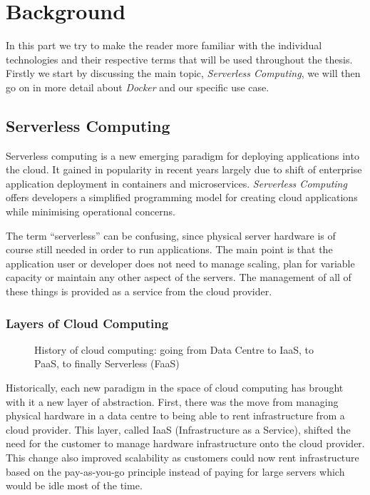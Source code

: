 \chapter{Background}
\label{sec:background}

In this part we try to make the reader more familiar with the individual technologies and their
respective terms that will be used throughout the thesis. Firstly we start by discussing the main
topic, \textit{Serverless Computing}, we will then go on in more detail about \textit{Docker} and
our specific use case.

\section{Serverless Computing}

Serverless computing is a new emerging paradigm for deploying applications into the cloud. It gained
in popularity in recent years largely due to shift of enterprise application deployment in
containers and microservices. \textit{Serverless Computing} offers developers a simplified
programming model for creating cloud applications while minimising operational concerns.
\cite{servprog}

The term “serverless” can be confusing, since physical server hardware is of course still needed in
order to run applications. The main point is that the application user or developer does not need to
manage scaling, plan for variable capacity or maintain any other aspect of the servers. The
management of all of these things is provided as a service from the cloud provider.
\cite{wikiservcomp}

\subsection{Layers of Cloud Computing}

\begin{figure}[H]
  \centering
  \caption{History of cloud computing: going from Data Centre to IaaS, to PaaS, to finally
  Serverless (FaaS) \cite{layercloudcomp}}
\end{figure}

Historically, each new paradigm in the space of cloud computing has brought with it a new layer of
abstraction. First, there was the move from managing physical hardware in a data centre to being
able to rent infrastructure from a cloud provider. This layer, called IaaS (Infrastructure as a
Service), shifted the need for the customer to manage hardware infrastructure onto the cloud
provider. This change also improved scalability as customers could now rent infrastructure based on
the pay-as-you-go principle instead of paying for large servers which would be idle most of the
time.

